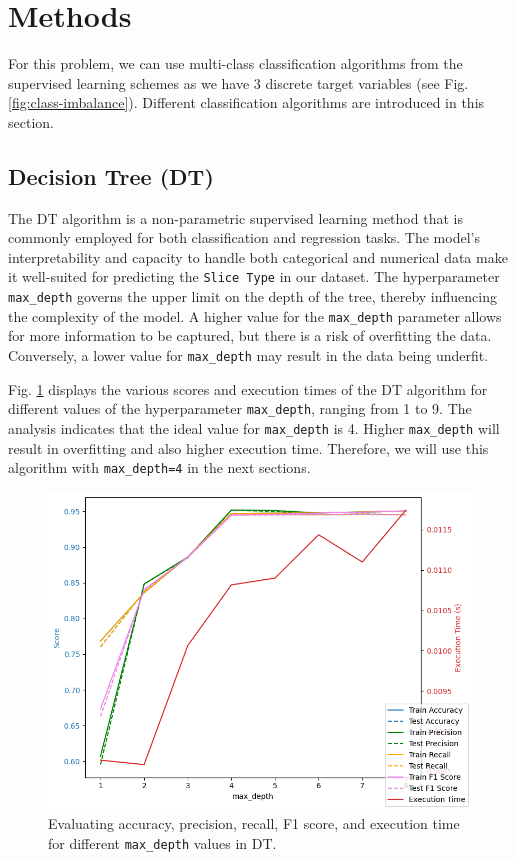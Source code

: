 \documentclass[conference]{IEEEtran}
\begin{document}
\section{Methods} \label{methods}%
For this problem, we can use multi-class classification algorithms from the supervised learning schemes as we have 3 discrete target variables (see Fig. \ref{fig:class-imbalance}). Different classification algorithms are introduced in this section.

\subsection{Decision Tree (DT)}
The DT algorithm is a non-parametric supervised learning method that is commonly employed for both classification and regression tasks. The model's interpretability and capacity to handle both categorical and numerical data make it well-suited for predicting the \texttt{\footnotesize Slice Type} in our dataset. The hyperparameter \texttt{\footnotesize max\_depth} governs the upper limit on the depth of the tree, thereby influencing the complexity of the model. A higher value for the \texttt{\footnotesize max\_depth} parameter allows for more information to be captured, but there is a risk of overfitting the data. Conversely, a lower value for \texttt{\footnotesize max\_depth} may result in the data being underfit. 

Fig. \ref{fig:dt} displays the various scores and execution times of the DT algorithm for different values of the hyperparameter \texttt{\footnotesize max\_depth}, ranging from 1 to 9. The analysis indicates that the ideal value for \texttt{\footnotesize max\_depth} is 4. Higher \texttt{\footnotesize max\_depth} will result in overfitting and also higher execution time. Therefore, we will use this algorithm with \texttt{\footnotesize max\_depth=4} in the next sections.

\begin{figure}
    \centering
    \includegraphics[width=0.55\columnwidth]{dt_max_depth.png}
    \caption{Evaluating accuracy, precision, recall, F1 score, and execution time for different \texttt{\footnotesize max\_depth} values in DT.}
    \label{fig:dt}
\end{figure}
\end{document}
